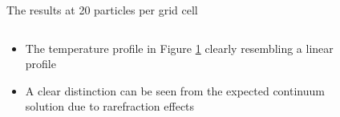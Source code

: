 \documentclass{beamer}
\begin{document}
        \begin{frame}{The results at 20 particles per grid cell}
            \begin{columns}
                \begin{column}{0.5\linewidth}
                    \begin{itemize}
                        \setlength\itemsep{0.25cm}
                                
                        \item<1->The temperature profile in Figure \ref{gra:kn0.1_20ppgc_100g} clearly resembling a linear profile

                        \item<2-> A clear distinction can be seen from the expected continuum solution due to rarefraction effects
                    \end{itemize}                    
                \end{column} 
            
                \begin{column}{0.5\linewidth}
                    \begin{figure}
                        \centering
                        
                        \caption{}
                        \label{gra:kn0.1_20ppgc_100g}
                    \end{figure}
                \end{column}
            \end{columns}
        \end{frame}
\end{document}
